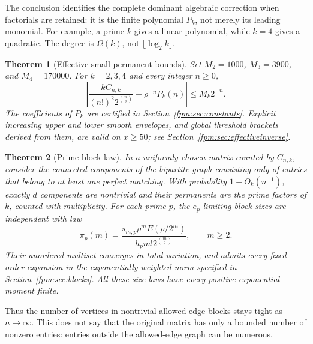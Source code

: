 \documentclass[11pt]{article}
\newtheorem{theorem}{Theorem}[section]
\theoremstyle{definition}\newtheorem{definition}[theorem]{Definition}
\theoremstyle{remark}\newtheorem{remark}[theorem]{Remark}
\begin{document}
The conclusion identifies the complete dominant algebraic correction when factorials are retained: it is the finite polynomial $P_k$, not merely its leading monomial. For example, a prime $k$ gives a linear polynomial, while $k=4$ gives a quadratic. The degree is $\Omega(k)$, not $\lfloor\log_2 k\rfloor$.

\begin{theorem}[Effective small permanent bounds]\label{fpm:thm:effectiveintro}
Set $M_2=1000$, $M_3=3900$, and $M_4=170000$. For $k=2,3,4$ and every integer $n\ge0$,
\begin{equation}\label{fpm:eq:effective}
 \left|\frac{kC_{n,k}}{(n!)^2 2^{\binom n2}}-\rho^{-n}P_k(n)\right|
 \le M_k2^{-n}.
\end{equation}
The coefficients of $P_k$ are certified in Section~\ref{fpm:sec:constants}. Explicit increasing upper and lower smooth envelopes, and global threshold brackets derived from them, are valid on $x\ge50$; see Section~\ref{fpm:sec:effectiveinverse}.
\end{theorem}

\begin{theorem}[Prime block law]\label{fpm:thm:blocksintro}
In a uniformly chosen matrix counted by $C_{n,k}$, consider the connected components of the bipartite graph consisting only of entries that belong to at least one perfect matching. With probability $1-O_k(n^{-1})$, exactly $d$ components are nontrivial and their permanents are the prime factors of $k$, counted with multiplicity. For each prime $p$, the $e_p$ limiting block sizes are independent with law
\begin{equation}\label{fpm:eq:pi}
 \pi_p(m)=\frac{s_{m,p}\rho^mE(\rho/2^m)}{h_pm!2^{\binom m2}},\qquad m\ge2.
\end{equation}
Their unordered multiset converges in total variation, and admits every fixed-order expansion in the exponentially weighted norm specified in Section~\ref{fpm:sec:blocks}. All these size laws have every positive exponential moment finite.
\end{theorem}

Thus the number of vertices in nontrivial allowed-edge blocks stays tight as $n\to\infty$. This does not say that the original matrix has only a bounded number of nonzero entries: entries outside the allowed-edge graph can be numerous.
\end{document}
